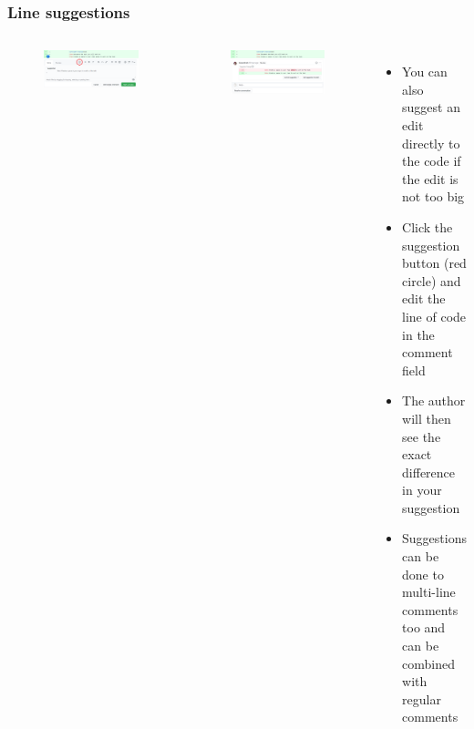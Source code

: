 \documentclass[aspectratio=169]{beamer} %
\begin{document}
\begin{frame}
	\frametitle{Line suggestions}
	\begin{columns}[c]

		\vspace{-.6cm}
		\begin{figure}
			\centering
			\includegraphics[width=\textwidth]{./img/suggestion-1.png}
		\end{figure}
		\vspace{-.3cm}
		\begin{figure}
			\centering
			\includegraphics[width=\textwidth]{./img/suggestion-2.png}
		\end{figure}

		\begin{itemize}
			\setlength\itemsep{.74em}
			\item You can also suggest an edit directly to the code
			if the edit is not too big
			\item Click the suggestion button (red circle) 
			and edit the line of code in the comment field
			\item The author will then see the exact difference in your suggestion
			\item Suggestions can be done to multi-line comments too
			and can be combined with regular comments
		\end{itemize}

	\end{columns}
\end{frame}
\end{document}
